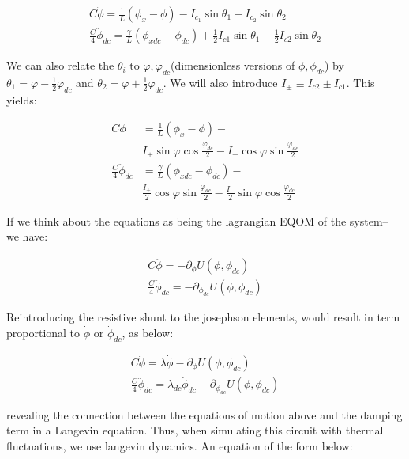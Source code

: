 \documentclass[paper=a4, twocolumn, fontsize=10pt]{article} %
\numberwithin{equation}{section} %
\numberwithin{figure}{section} %
\numberwithin{table}{section} %
\begin{document}
\begin{align}
    C \ddot{\phi} = \frac{1}{L}\left( \phi_x - \phi \right) - I_{c_1} \sin \theta_1 - I_{c_2} \sin \theta_2
    \\
    \frac{C}{4} \ddot{\phi}_{dc}= \frac{\gamma}{L}\left( \phi_{xdc} -\phi_{dc}\right) +\frac{1}{2}I_{c1} \sin\theta_1 - \frac{1}{2} I_{c2} \sin \theta_2
    \end{align}



We can also relate the $\theta_i$ to $\varphi,\varphi_{dc}$(dimensionless versions of $\phi,\phi_{dc}$) by $\theta_1 = \varphi - \frac{1}{2}\varphi_{dc} $ and $\theta_2 = \varphi + \frac{1}{2}\varphi_{dc} $. We will also introduce $I_{\pm} \equiv I_{c2} \pm I_{c1}$.  This yields:

\begin{align}
    C \ddot{\phi} &= \frac{1}{L}\left( \phi_x - \phi \right) - 
    \\
    &I_{+} \sin \varphi \cos \frac{\varphi_{dc}}{2} - I_{-} \cos \varphi \sin \frac{\varphi_{dc}}{2}
    \\
    \frac{C}{4} \ddot{\phi}_{dc} &= \frac{\gamma}{L}\left( \phi_{xdc} -\phi_{dc}\right) - 
    \\
    &\frac{I_{+}}{2} \cos \varphi \sin \frac{\varphi_{dc}}{2} - \frac{I_{-}}{2} \sin \varphi \cos \frac{\varphi_{dc}}{2}
\end{align}

If we think about the equations as being the lagrangian EQOM of the system-- we have:

\begin{align}
    C \ddot{\phi} = - \partial_\phi U(\phi, \phi_{dc})
    \\
    \frac{C}{4} \ddot{\phi}_{dc} = - \partial_{\phi_{dc}} U(\phi, \phi_{dc})
    \end{align}


Reintroducing the resistive shunt to the josephson elements, would result in term proportional to $\dot{\phi}$ or $\dot{\phi}_{dc}$, as below:

\begin{align}
C \ddot{\phi} = \lambda \dot{\phi} - \partial_\phi U(\phi, \phi_{dc})
\\
\frac{C}{4} \ddot{\phi}_{dc} = \lambda_{dc} \dot{\phi}_{dc} - \partial_{\phi_{dc}} U(\phi, \phi_{dc})
\end{align}

revealing the connection between the equations of motion above and the damping term in a Langevin equation. Thus, when simulating this circuit with thermal fluctuations, we use langevin dynamics. An equation of the form below:
\end{document}

